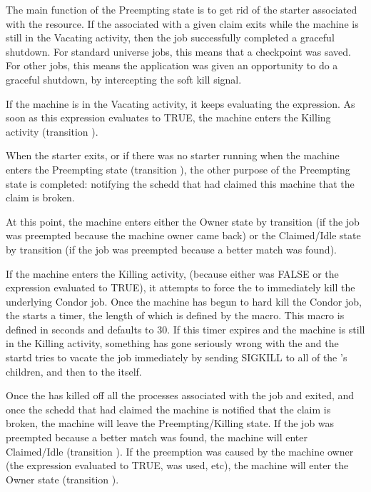 The main function of the Preempting state is to get rid of the starter
associated with the resource.  If the  associated with
a given claim exits while the machine is still in the Vacating
activity, then the job successfully completed a graceful shutdown.
For standard universe jobs, this means that a checkpoint was saved.
For other jobs, this means the application was given an opportunity to
do a graceful shutdown, by intercepting the soft kill signal.

If the machine is in the Vacating activity, it keeps evaluating the 
 expression.
As soon as this expression evaluates to TRUE,
the machine enters the Killing activity (transition ).

When the starter exits, or if there was no starter running when the
machine enters the Preempting state (transition ),
the other purpose of the Preempting state is completed:
notifying the schedd that had claimed this machine that the claim is
broken.

At this point, the machine enters either the Owner state by
transition  (if the job was preempted because the machine
owner came back) or the Claimed/Idle state by transition 
(if the job was preempted because a better match was found).

If the machine enters the Killing activity, (because either
 was FALSE or the  expression evaluated
to TRUE), it attempts to force the  to immediately
kill the underlying Condor job.
Once the machine has begun to hard kill the Condor job, the
 starts a timer, the length of which is defined by the
 \label{param:KillingTimeout} macro.
This macro is defined in seconds and defaults to 30.
If this timer expires and the machine is still in
the Killing activity, something has gone seriously wrong with the
 and the startd tries to vacate the job immediately by
sending SIGKILL to all of the 's children, and then to
the  itself.

Once the  has killed off all the processes associated
with the job and exited, and once the schedd that had claimed the
machine is notified that the claim is broken, the machine will leave
the Preempting/Killing state.
If the job was preempted because a better match was found, the machine
will enter Claimed/Idle (transition ).
If the preemption was caused by the machine owner (the 
expression evaluated to TRUE,  was used, etc), the
machine will enter the Owner state (transition ).


